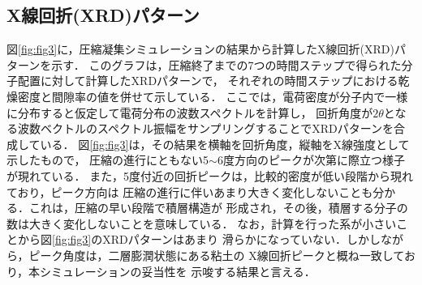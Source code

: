 ﻿\documentclass[11pt,a4j]{jarticle}
\begin{document}
\subsection{X線回折(XRD)パターン}
図\ref{fig:fig3}に，圧縮凝集シミュレーションの結果から計算したX線回折(XRD)パターンを示す．
このグラフは，圧縮終了までの7つの時間ステップで得られた分子配置に対して計算したXRDパターンで，
それぞれの時間ステップにおける乾燥密度と間隙率の値を併せて示している．
ここでは，電荷密度が分子内で一様に分布すると仮定して電荷分布の波数スペクトルを計算し，
回折角度が$2\theta$となる波数ベクトルのスペクトル振幅をサンプリングすることでXRDパターンを合成している．
図\ref{fig:fig3}は，その結果を横軸を回折角度，縦軸をX線強度として示したもので，
圧縮の進行にともない5$\sim$6度方向のピークが次第に際立つ様子が現れている．
また，5度付近の回折ピークは，比較的密度が低い段階から現れており，ピーク方向は
圧縮の進行に伴いあまり大きく変化しないことも分かる．これは，圧縮の早い段階で積層構造が
形成され，その後，積層する分子の数は大きく変化しないことを意味している．
なお，計算を行った系が小さいことから図\ref{fig:fig3}のXRDパターンはあまり
滑らかになっていない．しかしながら，ピーク角度は，二層膨潤状態にある粘土の
X線回折ピークと概ね一致しており\cite{Morodome}，本シミュレーションの妥当性を
示唆する結果と言える．
\end{document}
